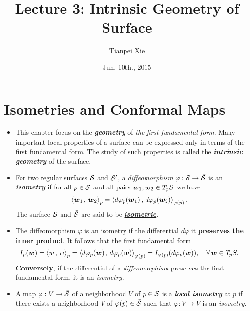 \documentclass[11pt]{article}
\begin{document}
\title{Lecture 3: Intrinsic Geometry of Surface}
\author{ Tianpei Xie}
\date{ Jun. 10th., 2015 }
\maketitle
\tableofcontents
\newpage
\allowdisplaybreaks
\section{Isometries and Conformal Maps}
\begin{itemize}
\item This chapter focus on the \emph{\textbf{geometry}} of \emph{the first fundamental form}. Many important local properties of a surface can be expressed only in terms of the first fundamental form. The study of such properties is called the \emph{\textbf{intrinsic geometry}} of the surface.

\item 
\begin{definition}
For two regular surfaces ${\mathcal S}$ and ${\mathcal S}'$, a \emph{diffeomorphism} $\varphi: {\mathcal S} \rightarrow \bar{{\mathcal S}}$ is an \underline{\emph{\textbf{isometry}}} if for all $p\in {\mathcal S}$ and all pairs $\boldsymbol{w}_{1}, \boldsymbol{w}_{2} \in T_{p}S$ we have
\begin{align*}
\left\langle \boldsymbol{w}_{1}\,,\, \boldsymbol{w}_{2} \right\rangle_{p} &= \left\langle d\varphi_{p}(\boldsymbol{w}_{1})\,,\, d\varphi_{p}(\boldsymbol{w}_{2}) \right\rangle_{\varphi(p)}.
\end{align*} 
The surface ${\mathcal S}$ and $\bar{{\mathcal S}}$ are said to be \underline{\emph{\textbf{isometric}}}. 
\end{definition}

\item The diffeomorphism $\varphi$ is an isometry if the differential $d\varphi$ it \textbf{preserves the inner product}. It follows that the first fundamental form 
\begin{align}
I_{p}(\boldsymbol{w}) &= \left\langle w\,,\, w \right\rangle_{p} = \left\langle d\varphi_{p}(\boldsymbol{w})\,,\, d\varphi_{p}(\boldsymbol{w}) \right\rangle_{\varphi(p)} = I_{\varphi(p)}(d\varphi_{p}(\boldsymbol{w})),\quad \forall\,\boldsymbol{w}\in T_{p}S. \label{eqn: 1st_fundamental_form_inner_prod}
\end{align}  \textbf{Conversely}, if the differential of a \emph{diffeomorphism} preserves the first fundamental form, it is an \emph{isometry}. 


\item \begin{definition}
A map $\varphi: V \rightarrow \bar{{\mathcal S}}$ of a neighborhood $V$ of $p\in {\mathcal S}$ is a \emph{\textbf{local isometry}} at $p$ if there exists a neighborhood $\bar{V}$ of $\varphi(p) \in \bar{{\mathcal S}}$ such that $\varphi: V \rightarrow \bar{V}$ is an \emph{isometry}.  


\end{definition}
\end{itemize}
\end{document}
